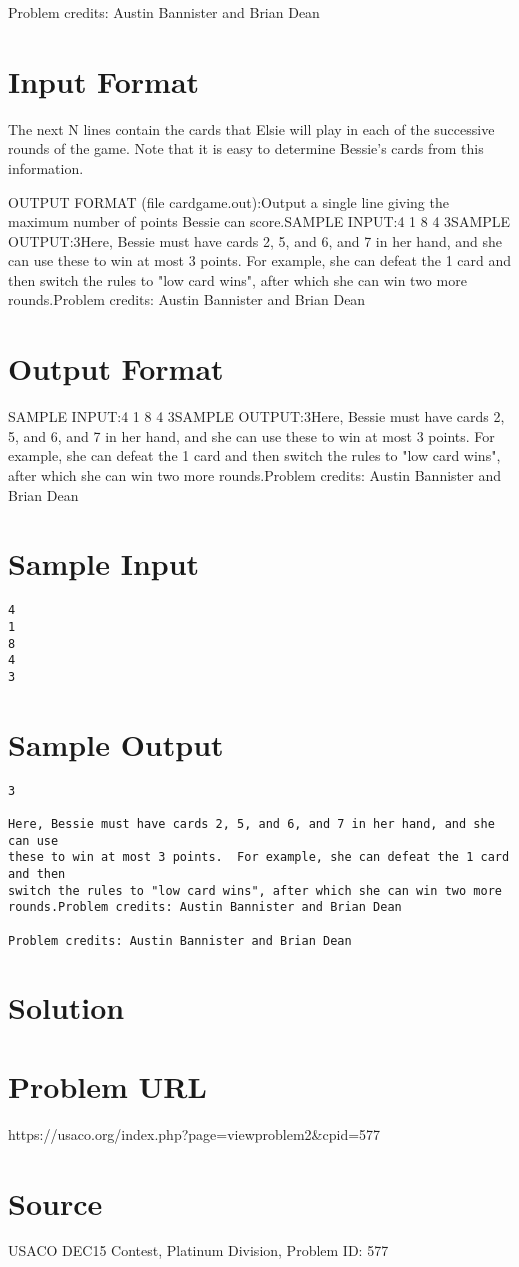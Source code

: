 \documentclass[12pt]{article}
\begin{document}
Problem credits: Austin Bannister and Brian Dean



\section*{Input Format}
The next N lines contain the cards that Elsie will play in each of the
successive rounds of the game.  Note that it is easy to determine Bessie's cards
from this information.

OUTPUT FORMAT (file cardgame.out):Output a single line giving the maximum number of points Bessie can score.SAMPLE INPUT:4
1
8
4
3SAMPLE OUTPUT:3Here, Bessie must have cards 2, 5, and 6, and 7 in her hand, and she can use
these to win at most 3 points.  For example, she can defeat the 1 card and then
switch the rules to "low card wins", after which she can win two more rounds.Problem credits: Austin Bannister and Brian Dean

\section*{Output Format}
SAMPLE INPUT:4
1
8
4
3SAMPLE OUTPUT:3Here, Bessie must have cards 2, 5, and 6, and 7 in her hand, and she can use
these to win at most 3 points.  For example, she can defeat the 1 card and then
switch the rules to "low card wins", after which she can win two more rounds.Problem credits: Austin Bannister and Brian Dean

\section*{Sample Input}
\begin{verbatim}
4
1
8
4
3
\end{verbatim}

\section*{Sample Output}
\begin{verbatim}
3

Here, Bessie must have cards 2, 5, and 6, and 7 in her hand, and she can use
these to win at most 3 points.  For example, she can defeat the 1 card and then
switch the rules to "low card wins", after which she can win two more rounds.Problem credits: Austin Bannister and Brian Dean

Problem credits: Austin Bannister and Brian Dean
\end{verbatim}

\section*{Solution}


\section*{Problem URL}
https://usaco.org/index.php?page=viewproblem2&cpid=577

\section*{Source}
USACO DEC15 Contest, Platinum Division, Problem ID: 577
\end{document}
